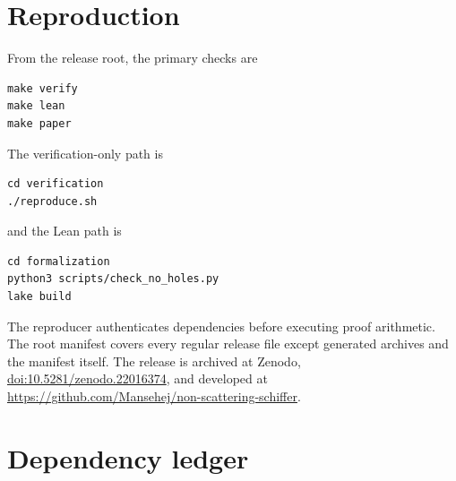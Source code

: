 \documentclass[11pt]{amsart}
\begin{document}
\section{Reproduction}

From the release root, the primary checks are
\begin{lstlisting}[basicstyle=\ttfamily\small,frame=single]
make verify
make lean
make paper
\end{lstlisting}
The verification-only path is
\begin{lstlisting}[basicstyle=\ttfamily\small,frame=single]
cd verification
./reproduce.sh
\end{lstlisting}
and the Lean path is
\begin{lstlisting}[basicstyle=\ttfamily\small,frame=single]
cd formalization
python3 scripts/check_no_holes.py
lake build
\end{lstlisting}
The reproducer authenticates dependencies before executing proof arithmetic.
The root manifest covers every regular release file except generated archives
and the manifest itself.  The release is archived at Zenodo,
\href{https://doi.org/10.5281/zenodo.22016374}{doi:10.5281/zenodo.22016374},
and developed at
\url{https://github.com/Mansehej/non-scattering-schiffer}.

\section{Dependency ledger}
\end{document}
